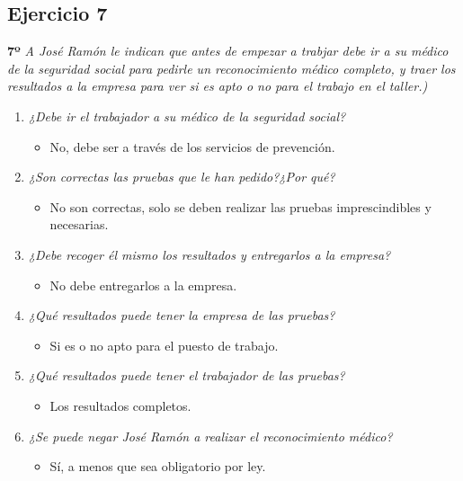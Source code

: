 \documentclass{article}
\begin{document}
        \subsection{Ejercicio 7}
        \textbf{7º} \textit{A José Ramón le indican que antes de empezar a trabjar debe ir a su médico de la seguridad social para pedirle un reconocimiento médico completo, y traer los resultados a la empresa para ver si es 
        apto o no para el trabajo en el taller.)}
        \\
        \begin{enumerate}[label=(\alph*)]
          \item \textit{¿Debe ir el trabajador a su médico de la seguridad social?}
            \begin{itemize}
              \item No, debe ser a través de los servicios de prevención.
            \end{itemize}
          \item \textit{¿Son correctas las pruebas que le han pedido?¿Por qué?}
            \begin{itemize}
              \item No son correctas, solo se deben realizar las pruebas imprescindibles y necesarias.
            \end{itemize}
          \item \textit{¿Debe recoger él mismo los resultados y entregarlos a la empresa?}
            \begin{itemize}
              \item No debe entregarlos a la empresa.
            \end{itemize}
          \item \textit{¿Qué resultados puede tener la empresa de las pruebas?}
            \begin{itemize}
              \item Si es o no apto para el puesto de trabajo.
            \end{itemize}
          \item \textit{¿Qué resultados puede tener el trabajador de las pruebas?}
            \begin{itemize}
              \item Los resultados completos.
            \end{itemize}
          \item \textit{¿Se puede negar José Ramón a realizar el reconocimiento médico?}
            \begin{itemize}
              \item Sí, a menos que sea obligatorio por ley.
            \end{itemize}
        \end{enumerate}
      \newpage
\end{document}
